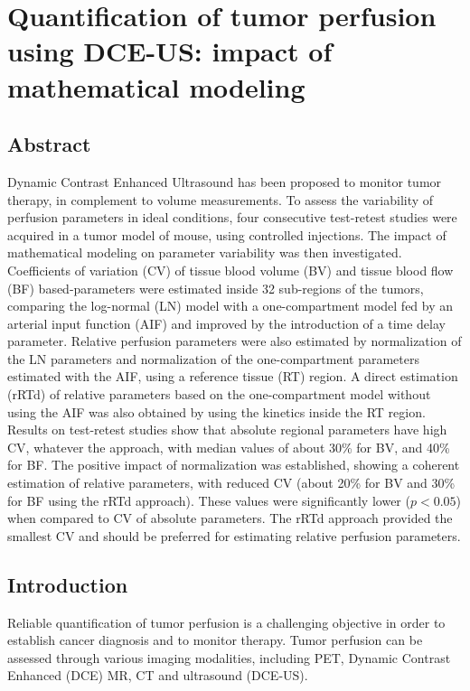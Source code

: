 \chapter{Quantification of tumor perfusion using DCE-US: impact of mathematical modeling}\label{chapter:PMB}

\section{Abstract}
Dynamic Contrast Enhanced Ultrasound has been proposed to monitor tumor therapy, in complement to volume measurements. To assess the variability of perfusion parameters in  ideal conditions, four consecutive test-retest studies were acquired in a tumor model of mouse, using controlled injections. The impact of mathematical modeling on parameter variability was then investigated. Coefficients of variation (CV) of tissue blood volume (BV) and tissue blood flow (BF) based-parameters were estimated inside 32 sub-regions of the tumors, comparing the log-normal (LN) model with a one-compartment model fed by an arterial input function (AIF) and improved by the introduction of a time delay parameter. Relative perfusion parameters were also estimated by normalization of the LN parameters and normalization of the one-compartment parameters estimated with the AIF, using a reference tissue (RT) region. A direct estimation (rRTd) of relative parameters  based on the one-compartment model without using the AIF was also obtained by using the kinetics inside the RT region.  Results on test-retest studies show that absolute regional parameters have high CV, whatever the approach, with median values of about 30\% for BV, and 40\% for BF. The positive impact of normalization was established, showing a coherent estimation of relative parameters, with reduced CV (about 20\% for BV and 30\% for BF using the rRTd approach). These values were significantly lower ($p<0.05$) when compared to CV of absolute parameters. The rRTd approach provided the smallest CV and should be preferred for estimating relative perfusion parameters. 

\section{Introduction}
Reliable quantification of tumor perfusion is a challenging objective in order to establish cancer diagnosis and to monitor therapy. Tumor perfusion can be assessed through various imaging modalities, including PET, Dynamic Contrast Enhanced (DCE) MR, CT  and ultrasound (DCE-US).

